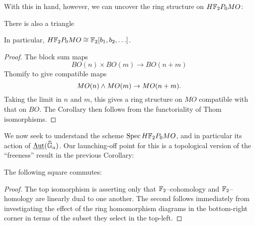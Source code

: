 With this in hand, however, we can uncover the ring structure on $H\mathbb F_2P_0 MO$:
\begin{corollary}\label{HF2MOisFree}
There is also a triangle
\begin{center}
\end{center}
In particular, $H\mathbb F_2P_0 MO \cong \mathbb F_2[b_1, b_2, \ldots]$.
\end{corollary}
\begin{proof}
The block sum maps \[BO(n) \times BO(m) \to BO(n+m)\] Thomify to give compatible maps \[MO(n) \wedge MO(m) \to MO(n+m).\]  Taking the limit in $n$ and $m$, this gives a ring structure on $MO$ compatible with that on $BO$.  The Corollary then follows from the functoriality of Thom isomorphisms.
\end{proof}

We now seek to understand the scheme $\operatorname{Spec} H\mathbb F_2P_0 MO$, and in particular its action of $\operatorname{\underline{\smash{\operatorname{Aut}}}}(\widehat{\mathbb G}_a)$.  Our launching-off point for this is a topological version of the ``freeness'' result in the previous Corollary:
\begin{lemma}\label{DetectingMORingMapsInHomotopy}
The following square commutes:
\begin{center}
\end{center}
\end{lemma}
\begin{proof}
The top isomorphism is asserting only that $\mathbb F_2$--cohomology and $\mathbb F_2$--homology are linearly dual to one another.  The second follows immediately from investigating the effect of the ring homomorphism diagrams in the bottom-right corner in terms of the subset they select in the top-left.
\end{proof}

